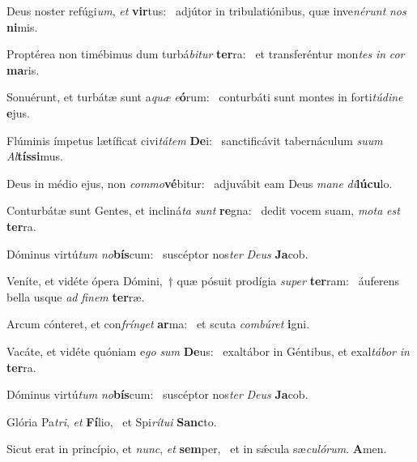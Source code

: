 \item Deus noster refúgi\textit{um}, \textit{et} \textbf{vir}tus:~\psstar{} adjútor in tribulatiónibus, quæ inve\textit{nérunt} \textit{nos} \textbf{ni}mis.
\item Proptérea non timébimus dum turbá\textit{bitur} \textbf{ter}ra:~\psstar{} et transferéntur mon\textit{tes} \textit{in} \textit{cor} \textbf{ma}ris.
\item Sonuérunt, et turbátæ sunt a\textit{quæ} \textit{e}\textbf{ó}rum:~\psstar{} conturbáti sunt montes in forti\textit{túdine} \textbf{e}jus.
\item Flúminis ímpetus lætíficat civi\textit{tátem} \textbf{De}i:~\psstar{} sanctificávit tabernáculum \textit{suum} \textit{Al}\textbf{tís}\textbf{si}mus.
\item Deus in médio ejus, non \textit{commo}\textbf{vé}bitur:~\psstar{} adjuvábit eam Deus \textit{mane} \textit{di}\textbf{lú}\textbf{cu}lo.
\item Conturbátæ sunt Gentes, et incliná\textit{ta} \textit{sunt} \textbf{re}gna:~\psstar{} dedit vocem suam, \textit{mota} \textit{est} \textbf{ter}ra.
\item Dóminus virtú\textit{tum} \textit{no}\textbf{bís}\-cum:~\psstar{} suscéptor nos\textit{ter} \textit{Deus} \textbf{Ja}cob.
\item Veníte, et vidéte ópera Dómini,~† quæ pósuit prodígia \textit{super} \textbf{ter}ram:~\psstar{} áuferens bella usque \textit{ad} \textit{finem} \textbf{ter}ræ.
\item Arcum cónteret, et con\textit{frínget} \textbf{ar}ma:~\psstar{} et scuta \textit{combúret} \textbf{i}gni.
\item Vacáte, et vidéte quóniam e\textit{go} \textit{sum} \textbf{De}us:~\psstar{} exaltábor in Géntibus, et exal\textit{tábor} \textit{in} \textbf{ter}ra.
\item Dóminus virtú\textit{tum} \textit{no}\textbf{bís}\-cum:~\psstar{} suscéptor nos\textit{ter} \textit{Deus} \textbf{Ja}cob.
\item Glória Pa\textit{tri}, \textit{et} \textbf{Fí}lio,~\psstar{} et Spi\textit{rítui} \textbf{Sanc}to.
\item Sicut erat in princípio, et \textit{nunc}, \textit{et} \textbf{sem}per,~\psstar{} et in sǽcula sæ\textit{culórum}. \textbf{A}men.

